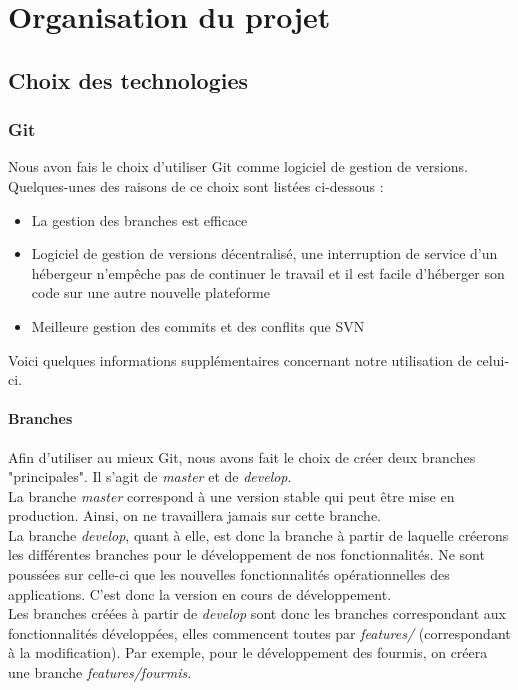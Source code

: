 \chapter{Organisation du projet}

	\section{Choix des technologies}

		\subsection{Git}

			Nous avon fais le choix d'utiliser Git comme logiciel de gestion de versions. Quelques-unes des raisons de ce choix sont listées ci-dessous :

			\begin{itemize}
				\item{La gestion des branches est efficace}
				\item{Logiciel de gestion de versions décentralisé, une interruption de service d'un hébergeur n'empêche pas de continuer le travail et il est facile d'héberger son code sur une autre nouvelle plateforme}
				\item{Meilleure gestion des commits et des conflits que SVN}
			\end{itemize}

			Voici quelques informations supplémentaires concernant notre utilisation de celui-ci.

			\subsubsection{Branches}

				Afin d'utiliser au mieux Git, nous avons fait le choix de créer deux branches "principales". Il s'agit de \textit{master} et de \textit{develop}.\\
				La branche \textit{master} correspond à une version stable qui peut être mise en production. Ainsi, on ne travaillera jamais sur cette branche.\\
				La branche \textit{develop}, quant à elle, est donc la branche à partir de laquelle créerons les différentes branches pour le développement de nos fonctionnalités. Ne sont poussées sur celle-ci que les nouvelles fonctionnalités opérationnelles des applications. C'est donc la version en cours de développement.\\
				Les branches créées à partir de \textit{develop} sont donc les branches correspondant aux fonctionnalités développées, elles commencent toutes par \textit{features/} (correspondant à la modification). Par exemple, pour le développement des fourmis, on créera une branche \textit{features/fourmis}.


